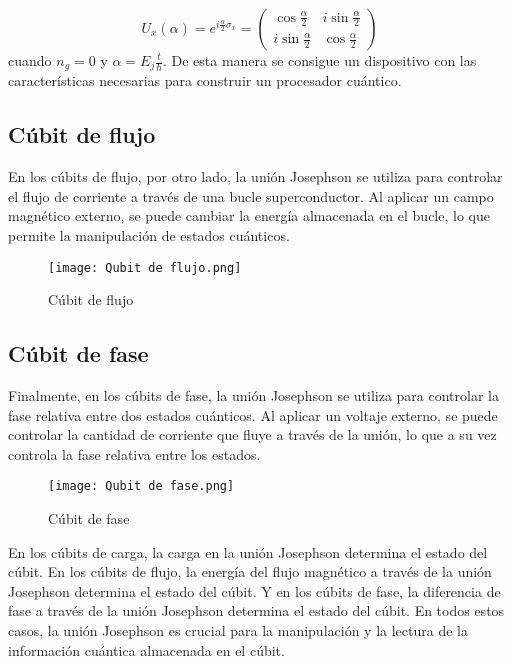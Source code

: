 \documentclass[12pt]{article}
\begin{document}
\begin{equation}\label{eq:2 rotation}
  U_x(\alpha )= e^{i\frac{\alpha }{2}\hat{\sigma_x}} = 
  \begin{pmatrix}
    \cos \frac{\alpha}{2}  & i\sin \frac{\alpha}{2} \\
    i\sin \frac{\alpha}{2} & \cos \frac{\alpha}{2}
  \end{pmatrix}
\end{equation}
cuando $n_g = 0$ y $\alpha = E_j \frac{t}{\hbar}$.
De esta manera se consigue un dispositivo con las características necesarias para construir un procesador cuántico.


\subsection{Cúbit de flujo}
En los cúbits de flujo, por otro lado, la unión Josephson se utiliza para controlar el flujo de corriente a través de una bucle superconductor. Al aplicar un campo magnético externo, se puede cambiar la energía almacenada en el bucle, lo que permite la manipulación de estados cuánticos.
\\
\begin{figure}[h]
  \centering
  \texttt{[image: Qubit de flujo.png]}
  \caption{Cúbit de flujo \cite{gu_microwave_2017}}
  \label{fig:Cúbit de flujo}
\end{figure}

\subsection{Cúbit de fase}
Finalmente, en los cúbits de fase, la unión Josephson se utiliza para controlar la fase relativa entre dos estados cuánticos. Al aplicar un voltaje externo, se puede controlar la cantidad de corriente que fluye a través de la unión, lo que a su vez controla la fase relativa entre los estados.
\\
\begin{figure}[h]
  \centering
  \texttt{[image: Qubit de fase.png]}
  \caption{Cúbit de fase \cite{gu_microwave_2017}}
  \label{fig:Cúbit de fase}
\end{figure}
  

En los cúbits de carga, la carga en la unión Josephson determina el estado del cúbit. En los cúbits de flujo, la energía del flujo magnético a través de la unión Josephson determina el estado del cúbit. Y en los cúbits de fase, la diferencia de fase a través de la unión Josephson determina el estado del cúbit. En todos estos casos, la unión Josephson es crucial para la manipulación y la lectura de la información cuántica almacenada en el cúbit.
\end{document}
